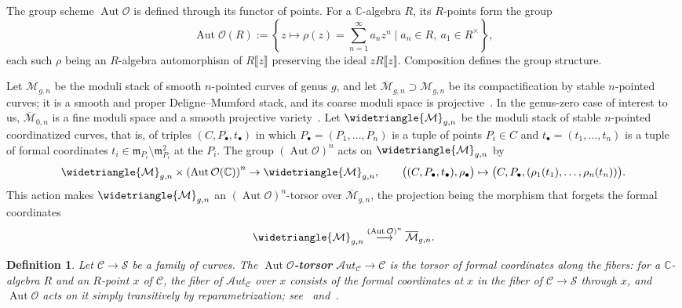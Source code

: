\documentclass[12pt,a4paper,reqno]{amsart}
\numberwithin{equation}{section}
\newtheorem{definition}[theorem]{Definition}
\theoremstyle{definition}
\newcommand{\Aut}{\operatorname{Aut}}
\newcommand{\AAut}{\mathscr{A}\textit{ut}}
\newcommand{\C}{\mathbb{C}}
\renewcommand{\S}{\mathcal{S}}
\newcommand{\M}{\mathcal{M}}
\newcommand{\CCC}{\mathscr{C}}
\newcommand{\lb}{\llbracket}
\newcommand{\rb}{\rrbracket}
\def\O{\mathcal{O}}
\begin{document}
The group scheme $\Aut \O$ is defined through its functor of points. For a $\C$-algebra $R$, its $R$-points form the group
\begin{equation}
    \Aut \O(R):= \left\{z \mapsto \rho(z) = \sum_{n=1}^{\infty} a_nz^n\mid a_{n} \in R,\ a_1 \in R^\times \right\},
\end{equation}
each such $\rho$ being an $R$-algebra automorphism of $R\lb z\rb$ preserving the ideal $z R\lb z\rb$. Composition defines the group structure.

Let $\M_{g,n}$ be the moduli stack of smooth $n$-pointed curves of genus $g$, and let $\overline{\M}_{g,n}\supset \M_{g,n}$ be its compactification by stable $n$-pointed curves; it is a smooth and proper Deligne--Mumford stack, and its coarse moduli space is projective~\cite{Knudsen1983a,Knudsen1983b}. In the genus-zero case of interest to us, $\overline{\M}_{0,n}$ is a fine moduli space and a smooth projective variety~\cite[Theorem 6.1]{Knudsen1983b}. Let $\widetriangle{\M}_{g,n}$ be the moduli stack of stable $n$-pointed coordinatized curves, that is, of triples $(C, P_\bullet, t_\bullet)$ in which $P_\bullet= (P_1, \dots, P_n)$ is a tuple of points $P_i \in C$ and $t_\bullet = (t_1, \dots, t_n)$ is a tuple of formal coordinates $t_i \in \mathfrak{m}_{P_i} \setminus \mathfrak{m}^2_{P_i}$ at the $P_i$. The group $(\Aut \O)^n$ acts on $\widetriangle{\M}_{g,n}$ by
\begin{equation}
    \widetriangle{\M}_{g,n} \times \left(\Aut \O(\C)\right)^n \rightarrow \widetriangle{\M}_{g,n}, \qquad \big((C,P_\bullet,t_\bullet), \rho_\bullet\big) \mapsto \big(C,P_\bullet,(\rho_1(t_1), \dots, \rho_n(t_n))\big).
\end{equation}
This action makes $\widetriangle{\M}_{g,n}$ an $(\Aut \O)^n$-torsor over $\overline{\M}_{g,n}$, the projection being the morphism that forgets the formal coordinates
\begin{equation}
    \widetriangle{\M}_{g,n} \stackrel{(\Aut \O)^n}{\longrightarrow} \overline{\M}_{g,n}.
\end{equation}
\begin{definition}
    Let $\CCC \rightarrow \S$ be a family of curves. The \textbf{$\Aut \O$-torsor} $\AAut_\CCC \rightarrow \CCC$ is the torsor of formal coordinates along the fibers: for a $\C$-algebra $R$ and an $R$-point $x$ of $\CCC$, the fiber of $\AAut_\CCC$ over $x$ consists of the formal coordinates at $x$ in the fiber of $\CCC \rightarrow \S$ through $x$, and $\Aut \O$ acts on it simply transitively by reparametrization; see~\cite{frenkel_ben_zvi_book} and~\cite[Section 2]{DGT2}.
\end{definition}
\end{document}
